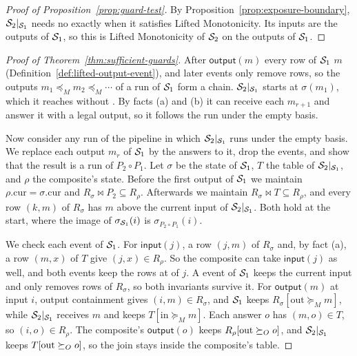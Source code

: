 \begin{proof}[Proof of Proposition~\ref{prop:guard-test}]
By Proposition~\ref{prop:exposure-boundary}, $\mathcal{S}_2|_{\mathcal{S}_1}$ needs
no \commitment exactly when it satisfies Lifted Monotonicity.  Its inputs are
the outputs of $\mathcal{S}_1$, so this is Lifted Monotonicity of $\mathcal{S}_2$ on the
outputs of $\mathcal{S}_1$.
\end{proof}

\begin{proof}[Proof of Theorem~\ref{thm:sufficient-guards}]
After $\mathsf{output}(m)$ every row of $\mathcal{S}_1$ \outrel $m$
(Definition~\ref{def:lifted-output-event}), and later events only remove
rows, so the outputs $m_1\preceq_M m_2\preceq_M\cdots$ of a run of $\mathcal{S}_1$
form a chain.  $\mathcal{S}_2|_{\mathcal{S}_1}$ starts at $\sigma(m_1)$, which it reaches
without \commitment.  By facts (a) and (b) it can receive each $m_{r+1}$ and
answer it with a legal output, so it follows the run under the empty basis.

Now consider any run of the pipeline in which $\mathcal{S}_2|_{\mathcal{S}_1}$ runs under
the empty basis.  We replace each output $m_r$ of $\mathcal{S}_1$ by the answers to
it, drop the \commitment events, and show that the result is a run of
$P_2\circ P_1$.  Let $\sigma$ be the state of $\mathcal{S}_1$, $T$ the table of
$\mathcal{S}_2|_{\mathcal{S}_1}$, and $\rho$ the composite's state.  Before the first
output of $\mathcal{S}_1$ we maintain $\rho.\mathrm{cur}=\sigma.\mathrm{cur}$ and
$R_\sigma\Join P_2\subseteq R_\rho$.  Afterwards we maintain $R_\sigma\Join
T\subseteq R_\rho$, and every row $(k,m)$ of $R_\sigma$ has $m$ above the
current input of $\mathcal{S}_2|_{\mathcal{S}_1}$.  Both hold at the start, where the
image of $\sigma_{\mathcal{S}_1}(i)$ is $\sigma_{P_2\circ P_1}(i)$.

We check each event of $\mathcal{S}_1$.  For $\mathsf{input}(j)$, a row $(j,m)$ of
$R_\sigma$ and, by fact (a), a row $(m,x)$ of $T$ give $(j,x)\in R_\rho$.  So
the composite can take $\mathsf{input}(j)$ as well, and both events keep the
rows at \indescs of $j$.  A \commitment event of $\mathcal{S}_1$ keeps the current
input and only removes rows of $R_\sigma$, so both invariants survive it.  For
$\mathsf{output}(m)$ at input $i$, output containment gives $(i,m)\in
R_\sigma$, and $\mathcal{S}_1$ keeps $R_\sigma[\mathrm{out}\succeq_M m]$, while
$\mathcal{S}_2|_{\mathcal{S}_1}$ receives $m$ and keeps $T[\mathrm{in}\succeq_M m]$.  Each
answer $o$ has $(m,o)\in T$, so $(i,o)\in R_\rho$.  The composite's
$\mathsf{output}(o)$ keeps $R_\rho[\mathrm{out}\succeq_O o]$, and
$\mathcal{S}_2|_{\mathcal{S}_1}$ keeps $T[\mathrm{out}\succeq_O o]$, so the join stays
inside the composite's table.


\end{proof}
